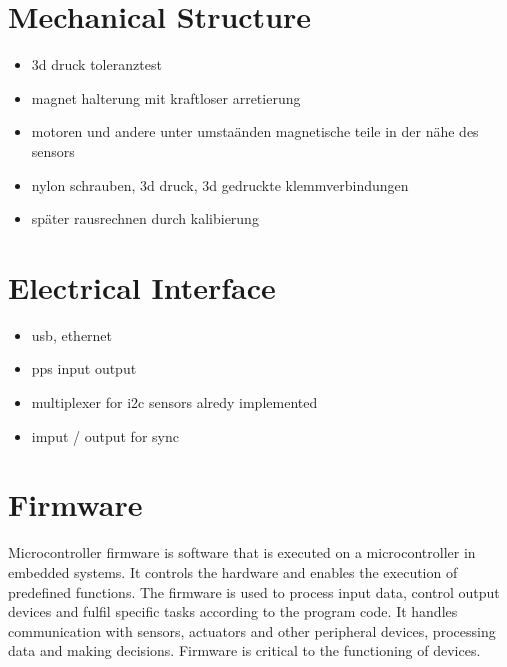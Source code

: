 \hypertarget{mechanical-structure}{%
\section{Mechanical Structure}\label{mechanical-structure}}

\begin{itemize}
\tightlist
\item
  3d druck toleranztest
\item
  magnet halterung mit kraftloser arretierung
\item
  motoren und andere unter umstaänden magnetische teile in der nähe des
  sensors
\item
  nylon schrauben, 3d druck, 3d gedruckte klemmverbindungen
\item
  später rausrechnen durch kalibierung
\end{itemize}

\hypertarget{electrical-interface}{%
\section{Electrical Interface}\label{electrical-interface}}

\begin{itemize}
\tightlist
\item
  usb, ethernet
\item
  pps input output
\item
  multiplexer for i2c sensors alredy implemented
\item
  imput / output for sync
\end{itemize}

\hypertarget{firmware}{%
\section{Firmware}\label{firmware}}

Microcontroller firmware is software that is executed on a
microcontroller in embedded systems. It controls the hardware and
enables the execution of predefined functions. The firmware is used to
process input data, control output devices and fulfil specific tasks
according to the program code. It handles communication with sensors,
actuators and other peripheral devices, processing data and making
decisions. Firmware is critical to the functioning of devices.

